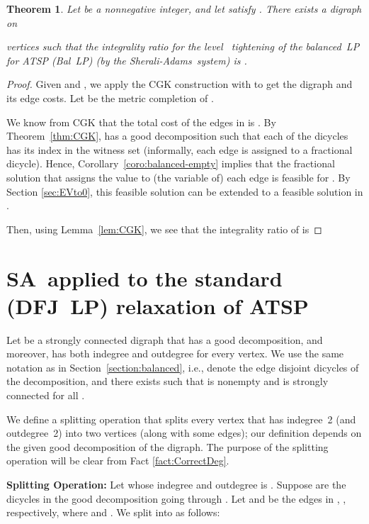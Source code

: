 \documentclass[11pt]{article}
\newtheorem{theorem}{Theorem}[section]
\newcommand{\sa}{\textsf{Sherali-Adams}}
\newcommand{\iSA}{\textsf{SA}}
\begin{document}
\begin{theorem}
\label{thm:IR-CGK}
Let  be a nonnegative integer, and let 
satisfy .
There exists a digraph on

vertices such that the integrality ratio for
the level~ tightening of the balanced~LP for ATSP (Bal~LP)
(by the \sa\ system)
is .
\end{theorem}

\begin{proof}
Given  and , we apply the CGK construction
with  to get the digraph 
and its edge costs. Let  be the metric completion of .

We know from CGK \cite{CGK06} that
the total cost of the edges in  is .
By Theorem~\ref{thm:CGK},  has a good decomposition 
such that each of the dicycles  has its index in the witness
set  (informally, each edge is assigned to a fractional
dicycle).
Hence, Corollary~\ref{coro:balanced-empty}
implies that the fractional solution that
assigns the value  to (the variable of) each edge
is feasible for . By Section \ref{sec:EVto0}, this feasible solution can
be extended to a feasible solution in .

Then, using Lemma~\ref{lem:CGK},
we see that the integrality ratio of
 is

\end{proof}





\section{\iSA\ applied to the standard (DFJ~LP) relaxation of ATSP}

Let  be a strongly connected digraph
that has a good decomposition, and moreover,
has both indegree and outdegree  for every vertex.
We use the same notation as in Section~\ref{section:balanced},
i.e.,  denote the
edge disjoint dicycles of the decomposition,
and there exists 
such that  is nonempty and
 is strongly connected for all .


We define a splitting operation that splits every vertex that
has indegree~2 (and outdegree~2)
into two vertices (along with some edges);
our definition depends on the given good decomposition of the digraph.
The purpose of the splitting operation will be
clear from Fact \ref{fact:CorrectDeg}.


\textbf{Splitting Operation:} Let   whose indegree and
outdegree is . Suppose  are the dicycles in the
good decomposition going through . Let  and 
be the edges in , , respectively,
where  and .  We split
 into  as follows:
\end{document}
